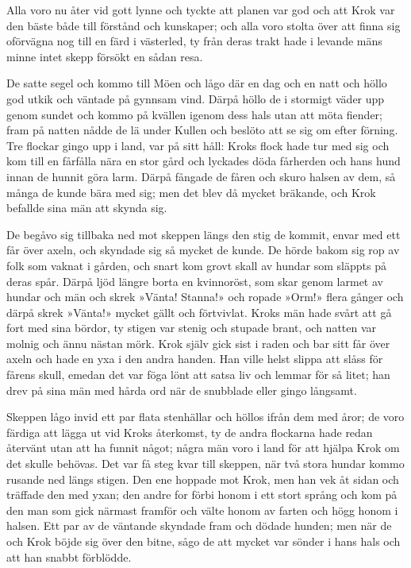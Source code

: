 \initial Alla voro nu åter vid gott lynne och tyckte att planen var god och att Krok var den bäste både till förstånd och kunskaper; och alla voro stolta över att finna sig oförvägna nog till en färd i västerled, ty från deras trakt hade i levande mäns minne intet skepp försökt en sådan resa.

\initial De satte segel och kommo till Möen och lågo där en dag och en natt och höllo god utkik och väntade på gynnsam vind. Därpå höllo de i stormigt väder upp genom sundet och kommo på kvällen igenom dess hals utan att möta fiender; fram på natten nådde de lä under Kullen och beslöto att se sig om efter förning. Tre flockar gingo upp i land, var på sitt håll: Kroks flock hade tur med sig och kom till en fårfålla nära en stor gård och lyckades döda fårherden och hans hund innan de hunnit göra larm. Därpå fångade de fåren och skuro halsen av dem, så många de kunde bära med sig; men det blev då mycket bräkande, och Krok befallde sina män att skynda sig.

\initial De begåvo sig tillbaka ned mot skeppen längs den stig de kommit, envar med ett får över axeln, och skyndade sig så mycket de kunde. De hörde bakom sig rop av folk som vaknat i gården, och snart kom grovt skall av hundar som släppts på deras spår. Därpå ljöd längre borta en kvinnoröst, som skar genom larmet av hundar och män och skrek »Vänta! Stanna!» och ropade »Orm!» flera gånger och därpå skrek »Vänta!» mycket gällt och förtvivlat. Kroks män hade svårt att gå fort med sina bördor, ty stigen var stenig och stupade brant, och natten var molnig och ännu nästan mörk. Krok själv gick sist i raden och bar sitt får över axeln och hade en yxa i den andra handen. Han ville helst slippa att slåss för fårens skull, emedan det var föga lönt att satsa liv och lemmar för så litet; han drev på sina män med hårda ord när de snubblade eller gingo långsamt.

\initial Skeppen lågo invid ett par flata stenhällar och höllos ifrån dem med åror; de voro färdiga att lägga ut vid Kroks återkomst, ty de andra flockarna hade redan återvänt utan att ha funnit något; några män voro i land för att hjälpa Krok om det skulle behövas. Det var få steg kvar till skeppen, när två stora hundar kommo rusande ned längs stigen. Den ene hoppade mot Krok, men han vek åt sidan och träffade den med yxan; den andre for förbi honom i ett stort språng och kom på den man som gick närmast framför och välte honom av farten och högg honom i halsen. Ett par av de väntande skyndade fram och dödade hunden; men när de och Krok böjde sig över den bitne, sågo de att mycket var sönder i hans hals och att han snabbt förblödde.

